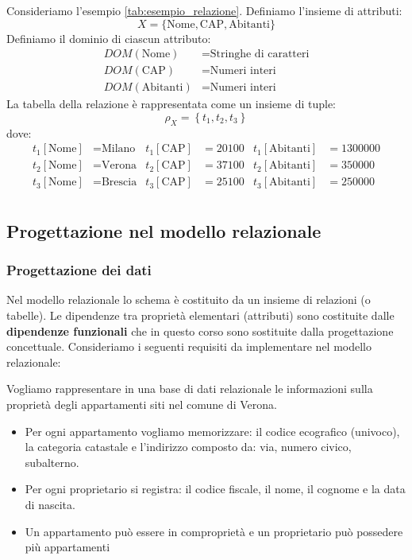 \documentclass[a4paper,twoside]{article}
\begin{document}
\begin{example}
  Consideriamo l'esempio \ref{tab:esempio_relazione}. Definiamo l'insieme di attributi:
  \[
    X = \{ \text{Nome}, \text{CAP}, \text{Abitanti} \}
  \] 
  Definiamo il dominio di ciascun attributo:
  \[
    \begin{aligned}
      DOM(\text{Nome}) & = \text{Stringhe di caratteri} \\
      DOM(\text{CAP}) & = \text{Numeri interi} \\
      DOM(\text{Abitanti}) & = \text{Numeri interi}
    \end{aligned}
  \]
  La tabella della relazione è rappresentata come un insieme di tuple:
  \[
    \rho_X = \left\{
      t_1, t_2, t_3
    \right\}
  \] 
  dove:
  \[
    \begin{aligned}
      t_1[\text{Nome}] & = \text{Milano} & t_1[\text{CAP}] & = 20100 & t_1[\text{Abitanti}] & = 1300000 \\
      t_2[\text{Nome}] & = \text{Verona} & t_2[\text{CAP}] & = 37100 & t_2[\text{Abitanti}] & = 350000 \\
      t_3[\text{Nome}] & = \text{Brescia} & t_3[\text{CAP}] & = 25100 & t_3[\text{Abitanti}] & = 250000 \\
    \end{aligned}
  \] 
\end{example}

\subsection{Progettazione nel modello relazionale}
\subsubsection{Progettazione dei dati}
Nel modello relazionale lo schema è costituito da un insieme di relazioni (o tabelle).
Le dipendenze tra proprietà elementari (attributi) sono costituite dalle
\textbf{dipendenze funzionali} che in questo corso sono sostituite dalla progettazione
concettuale. 
Consideriamo i seguenti requisiti da implementare nel modello relazionale:

Vogliamo rappresentare in una base di dati relazionale le informazioni sulla
proprietà degli appartamenti siti nel comune di Verona.
\begin{itemize}
  \item Per ogni appartamento vogliamo memorizzare: il codice ecografico (univoco),
    la categoria catastale e l’indirizzo composto da: via, numero civico,
    subalterno.

  \item Per ogni proprietario si registra: il codice fiscale, il nome, il cognome e la data
    di nascita.

  \item Un appartamento può essere in comproprietà e un proprietario può
    possedere più appartamenti
\end{itemize}
\end{document}
